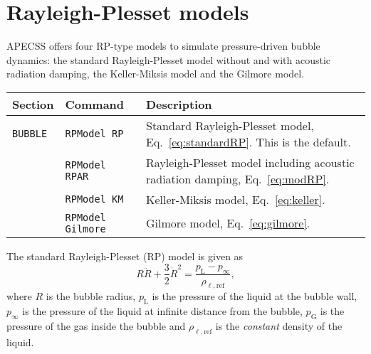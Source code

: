 \section{Rayleigh-Plesset models}
\label{sec:rpmodels}

APECSS offers four RP-type models to simulate pressure-driven bubble dynamics: the standard Rayleigh-Plesset model without and with acoustic radiation damping, the Keller-Miksis model and the Gilmore model.

\vspace{0.8em}

\noindent
\begin{tabular}{p{} p{} p{}}
    \textbf{Section} &\textbf{Command} & \textbf{Description} 
\vspace{1mm} \\ \hline
{\tt BUBBLE} & {\tt RPModel RP} & Standard Rayleigh-Plesset model, Eq.~\eqref{eq:standardRP}. This is the default.\\ 
 & {\tt RPModel RPAR} & Rayleigh-Plesset model including acoustic radiation damping, Eq.~\eqref{eq:modRP}.\\ 
 & {\tt RPModel KM} & Keller-Miksis model, Eq.~\eqref{eq:keller}.\\ 
 & {\tt RPModel Gilmore} & Gilmore model, Eq.~\eqref{eq:gilmore}.\\ 
 \hline
\end{tabular} \vspace{1em}

\noindent The standard Rayleigh-Plesset (RP) model is given as \citep{Lauterborn2010}
\begin{equation}
R \ddot{R} + \frac{3}{2} \dot{R}^2 = \frac{p_\text{L} - p_\infty}{\rho_{\ell,\mathrm{ref}}},
\label{eq:standardRP}
\end{equation}
where $R$ is the bubble radius, $p_\text{L}$ is the pressure of the liquid at the bubble wall, $p_\infty$ is the pressure of the liquid at infinite distance from the bubble, $p_\text{G}$ is the pressure of the gas inside the bubble and $\rho_{\ell,\mathrm{ref}}$ is the {\em constant} density of the liquid.

